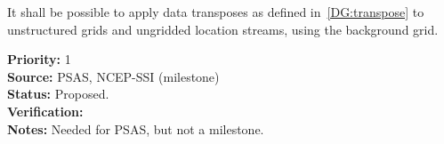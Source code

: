 
It shall be possible to apply data transposes as defined
in~\ref{DG:transpose} to unstructured grids and ungridded location
streams, using the background grid.

\begin{reqlist}
{\bf Priority:} 1 \\ 
{\bf Source:} PSAS, NCEP-SSI (milestone) \\
{\bf Status:} Proposed. \\
{\bf Verification:} \\
{\bf Notes:} Needed for PSAS, but not a milestone.
\end{reqlist}


